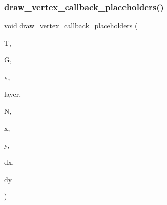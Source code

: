\subsubsection{\texorpdfstring{draw\+\_\+vertex\+\_\+callback\+\_\+placeholders()}{draw\_vertex\_callback\_placeholders()}}
{\footnotesize\ttfamily void draw\+\_\+vertex\+\_\+callback\+\_\+placeholders (\begin{DoxyParamCaption}\item[{\mbox{\hyperlink{classtree}{tree}} $\ast$}]{T,  }\item[{\mbox{\hyperlink{classmp__graphics}{mp\+\_\+graphics}} $\ast$}]{G,  }\item[{\mbox{\hyperlink{galois_8h_a09fddde158a3a20bd2dcadb609de11dc}{I\+NT}} $\ast$}]{v,  }\item[{\mbox{\hyperlink{galois_8h_a09fddde158a3a20bd2dcadb609de11dc}{I\+NT}}}]{layer,  }\item[{\mbox{\hyperlink{classtree__node}{tree\+\_\+node}} $\ast$}]{N,  }\item[{\mbox{\hyperlink{galois_8h_a09fddde158a3a20bd2dcadb609de11dc}{I\+NT}}}]{x,  }\item[{\mbox{\hyperlink{galois_8h_a09fddde158a3a20bd2dcadb609de11dc}{I\+NT}}}]{y,  }\item[{\mbox{\hyperlink{galois_8h_a09fddde158a3a20bd2dcadb609de11dc}{I\+NT}}}]{dx,  }\item[{\mbox{\hyperlink{galois_8h_a09fddde158a3a20bd2dcadb609de11dc}{I\+NT}}}]{dy }\end{DoxyParamCaption})}

\mbox{\label{treedraw_8_c_ad29db626e384e56cc12113ba0b00469b}} 
